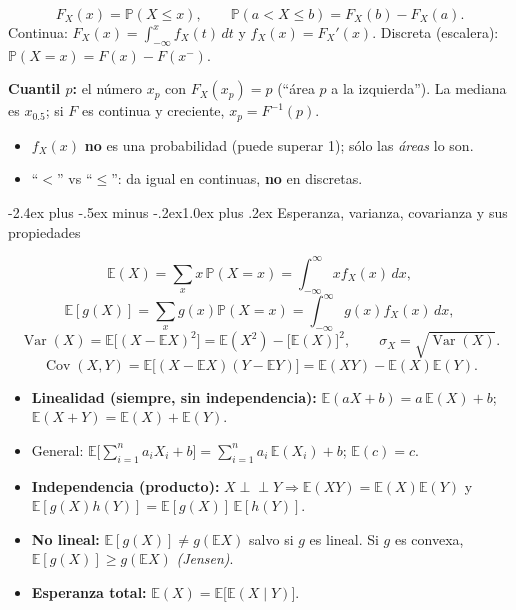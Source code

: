 \documentclass[10pt,a4paper]{article}
\makeatletter
\newcommand{\E}{\mathbb{E}}
\newcommand{\Prob}{\mathbb{P}}
\newcommand{\Var}{\operatorname{Var}}
\newcommand{\Cov}{\operatorname{Cov}}
\newcommand{\ind}{\perp\!\!\!\perp}
\renewcommand\section{\@startsection{section}{1}{0pt}%
  {-2.4ex plus -.5ex minus -.2ex}{1.0ex plus .2ex}%
  {\normalfont\large\bfseries\color{seccolor}}}
\makeatother
\begin{document}
\begin{defbox}[frametitle={Acumulada y cuantil}]
\[
F_X(x)=\Prob(X\le x),\qquad \Prob(a<X\le b)=F_X(b)-F_X(a).
\]
Continua: $F_X(x)=\displaystyle\int_{-\infty}^{x}f_X(t)\,dt$ y $f_X(x)=F_X'(x)$.
Discreta (escalera): $\Prob(X=x)=F(x)-F(x^-)$.

\smallskip
\textbf{Cuantil $p$:} el número $x_p$ con $F_X(x_p)=p$ (``área $p$ a la
izquierda''). La mediana es $x_{0.5}$; si $F$ es continua y creciente,
$x_p=F^{-1}(p)$.
\end{defbox}

\begin{warnbox}[frametitle={Dos trampas}]
\begin{itemize}
  \item $f_X(x)$ \textbf{no} es una probabilidad (puede superar 1); sólo las
        \emph{áreas} lo son.
  \item ``$<$'' vs ``$\le$'': da igual en continuas, \textbf{no} en discretas.
\end{itemize}
\end{warnbox}

\section{Esperanza, varianza, covarianza y sus propiedades}

\begin{defbox}[frametitle={Definiciones}]
\[
\E(X)=\sum_{x}x\,\Prob(X=x)=\int_{-\infty}^{\infty}x f_X(x)\,dx,
\]
\[
\E[g(X)]=\sum_{x}g(x)\Prob(X=x)=\int_{-\infty}^{\infty}g(x)f_X(x)\,dx,
\]
\[
\Var(X)=\E\big[(X-\E X)^2\big]=\E(X^2)-\big[\E(X)\big]^2,\qquad
\sigma_X=\sqrt{\Var(X)} .
\]
\[
\Cov(X,Y)=\E\big[(X-\E X)(Y-\E Y)\big]=\E(XY)-\E(X)\E(Y).
\]
\end{defbox}

\begin{thmbox}[frametitle={Propiedades de la esperanza}]
\begin{itemize}
  \item \textbf{Linealidad (siempre, sin independencia):}
        $\E(aX+b)=a\,\E(X)+b$;\quad $\E(X+Y)=\E(X)+\E(Y)$.
  \item General: $\E\!\big[\sum_{i=1}^n a_iX_i+b\big]=\sum_{i=1}^n a_i\,\E(X_i)+b$;
        $\E(c)=c$.
  \item \textbf{Independencia (producto):} $X\ind Y\Rightarrow
        \E(XY)=\E(X)\E(Y)$ y $\E[g(X)h(Y)]=\E[g(X)]\,\E[h(Y)]$.
  \item \textbf{No lineal:} $\E[g(X)]\ne g(\E X)$ salvo si $g$ es lineal.
        Si $g$ es convexa, $\E[g(X)]\ge g(\E X)$ \emph{(Jensen)}.
  \item \textbf{Esperanza total:} $\E(X)=\E\big[\E(X\mid Y)\big]$.
\end{itemize}
\end{thmbox}
\end{document}
